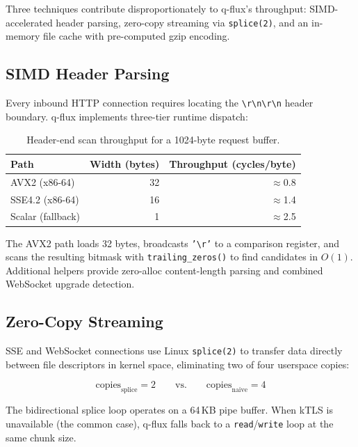 \documentclass[a4paper, 11pt]{article}
\begin{document}
Three techniques contribute disproportionately to q-flux's throughput:
SIMD-accelerated header parsing, zero-copy streaming via \texttt{splice(2)},
and an in-memory file cache with pre-computed gzip encoding.

\subsection{SIMD Header Parsing}
\label{sec:simd}

Every inbound HTTP connection requires locating the
\texttt{\textbackslash r\textbackslash n\textbackslash r\textbackslash n}
header boundary. q-flux implements three-tier runtime dispatch:

\begin{table}[t]
\centering
\caption{Header-end scan throughput for a 1024-byte request buffer.}
\label{tab:simd-perf}
\begin{tabular}{@{}lrr@{}}
\toprule
\textbf{Path} & \textbf{Width (bytes)} & \textbf{Throughput (cycles/byte)} \\
\midrule
AVX2  (x86-64)    & 32 & $\approx$0.8 \\
SSE4.2 (x86-64)   & 16 & $\approx$1.4 \\
Scalar (fallback)  &  1 & $\approx$2.5 \\
\bottomrule
\end{tabular}
\end{table}

The AVX2 path loads 32 bytes, broadcasts \texttt{'\textbackslash r'}
to a comparison register, and scans the resulting bitmask with
\texttt{trailing\_zeros()} to find candidates in $O(1)$. Additional
helpers provide zero-alloc content-length parsing and combined
WebSocket upgrade detection.

\subsection{Zero-Copy Streaming}
\label{sec:zero-copy}

SSE and WebSocket connections use Linux \texttt{splice(2)} to transfer
data directly between file descriptors in kernel space, eliminating
two of four userspace copies:

\begin{equation}
\text{copies}_{\text{splice}} = 2
\qquad\text{vs.}\qquad
\text{copies}_{\text{naive}} = 4
\end{equation}

The bidirectional splice loop operates on a 64\,KB pipe buffer. When
kTLS is unavailable (the common case), q-flux falls back to a
\texttt{read}/\texttt{write} loop at the same chunk size.
\end{document}
